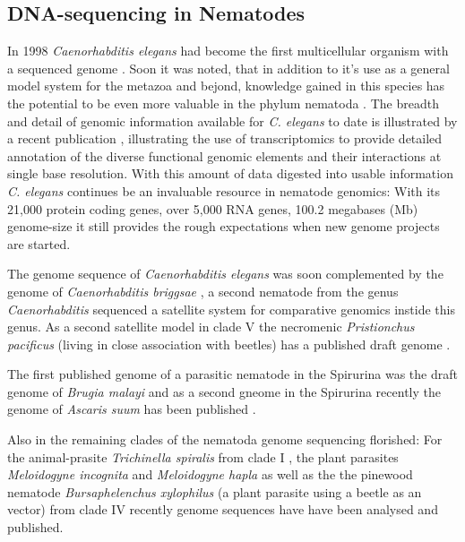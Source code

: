 \subsection{DNA-sequencing in Nematodes}
\label{sec:dna-sequ-nemat}

In 1998 \textit{Caenorhabditis elegans} had become the first
multicellular organism with a sequenced genome
\cite{pmid9851916}. Soon it was noted, that in addition to it's use as
a general model system for the metazoa and bejond, knowledge gained in
this species has the potential to be even more valuable in the phylum
nematoda \cite{blaxter_caenorhabditis_1998}. The breadth and detail of
genomic information available for \textit{C. elegans} to date is
illustrated by a recent publication \cite{pmid21177976}, illustrating
the use of transcriptomics to provide detailed annotation of the
diverse functional genomic elements and their interactions at single
base resolution. With this amount of data digested into usable
information \textit{C. elegans} continues be an invaluable resource in
nematode genomics: With its 21,000 protein coding genes, over 5,000
RNA genes, 100.2 megabases (Mb) genome-size it still provides the
rough expectations when new genome projects are started.

The genome sequence of \textit{Caenorhabditis elegans} was soon
complemented by the genome of \textit{Caenorhabditis briggsae}
\cite{stein_genome_2003}, a second nematode from the genus
\textit{Caenorhabditis} sequenced a satellite system for comparative
genomics instide this genus. As a second satellite model in clade V
the necromenic \textit{Pristionchus pacificus} (living in close
association with beetles) has a published draft genome
\cite{pmid18806794}. 

The first published genome of a parasitic nematode in the Spirurina
was the draft genome of \textit{Brugia malayi}
\cite{ghedin_draft_2007} and as a second gneome in the Spirurina
recently the genome of \textit{Ascaris suum} has been published
\cite{pmid22031327}.

Also in the remaining clades of the nematoda genome sequencing
florished: For the animal-prasite \textit{Trichinella spiralis} from
clade I \cite{pmid21336279}, the plant parasites \textit{Meloidogyne
  incognita} \cite{pmid18660804} and \textit{Meloidogyne hapla}
\cite{pmid18809916} as well as the the pinewood nematode
\textit{Bursaphelenchus xylophilus} \cite{pmid21909270} (a plant
parasite using a beetle as an vector) from clade IV recently genome
sequences have have been analysed and published.

